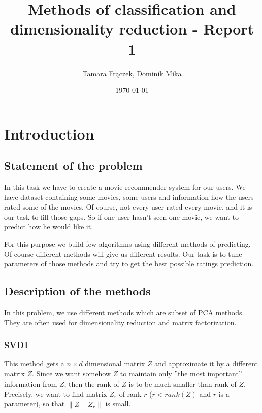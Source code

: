 \documentclass[10pt]{amsart}
\author{Tamara Frączek, Dominik Mika}
\title{Methods of classification and dimensionality reduction - Report 1}
\date{\today}
\begin{document}
\maketitle


\section{Introduction}

\subsection*{Statement of the problem}

In this task we have to create a movie recommender system for our users.
We have dataset containing some movies, some users and information how the users rated some of the movies.
Of course, not every user rated every movie, and it is our task to fill those gaps.
So if one user hasn't seen one movie, we want to predict how he would like it.





For this purpose we build few algorithms using different methods of predicting.
Of course different methods will give us different results.
Our task is to tune parameters of those methods and try to get the best possible ratings prediction.



\subsection*{Description of the methods}

In this problem, we use different methods which are subset of PCA methods.
They are often used for dimensionality reduction and matrix factorization.

\subsubsection*{SVD1}

This method gets a $n \times d$ dimensional matrix $Z$ and approximate it by a different matrix $\tilde{Z}$.
Since we want somehow $\tilde{Z}$ to maintain only ''the most important'' information from $Z$, then the rank of $\tilde{Z}$ is to be much smaller than rank of $Z$.
Precisely, we want to find matrix $\tilde{Z}_r$ of rank $r$ ($r < rank(Z)$ and $r$ is a parameter), so that $\|Z - \tilde{Z}_r\|$ is small.
\end{document}

